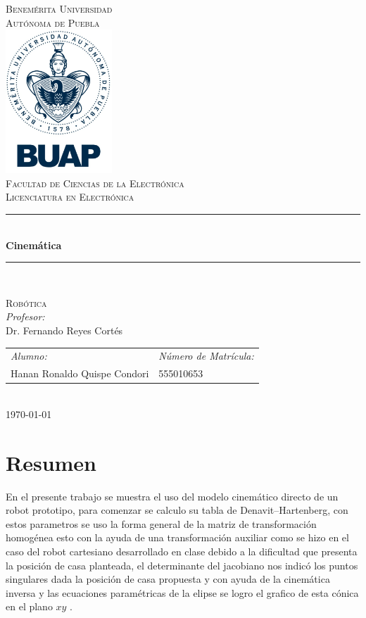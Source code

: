\documentclass[12pt]{article}
\date{\today}
\begin{document}
\begin{titlepage}
\newcommand{\HRule}{\rule{\linewidth}{0.5mm}} 
\center
\textsc{\LARGE  Benemérita Universidad \\[0.2cm] Autónoma de Puebla}\\[1.5cm] 
\includegraphics[width=4cm]{IMAGENES/escudo}\\[1cm]
\textsc{\Large Facultad de Ciencias de la Electrónica}\\[0.5cm] 
\textsc{\large Licenciatura en Electrónica}\\[0.5cm]
\HRule \\[0.4cm]
{ \huge \bfseries Cinemática}\\[0.4cm] 
\HRule \\[1.5cm]
\begin{minipage}{\textwidth}
\center 
\textsc{\LARGE Robótica}\\[1.7cm] 
\emph{Profesor:} \\
Dr. Fernando Reyes Cortés \\[1cm]
\begin{tabular}{ll}
\emph{Alumno:} & \emph{Número de Matrícula:}\\
Hanan Ronaldo Quispe Condori  & 555010653\\
\end{tabular}
\end{minipage}\\[2cm]
\today
\end{titlepage}

\newpage
\section{Resumen}
En el presente trabajo se muestra el uso del modelo cinemático directo de un robot prototipo, para comenzar se calculo su tabla de Denavit–Hartenberg, con estos parametros se uso la forma general de la matriz de transformación homogénea esto con la ayuda de una transformación auxiliar como se hizo en el caso del robot cartesiano desarrollado en clase debido a la dificultad que presenta la posición de casa planteada, el determinante del jacobiano nos indicó los puntos singulares dada la posición de casa propuesta y con ayuda de la cinemática inversa y las ecuaciones paramétricas de la elipse se logro el grafico de esta cónica en el plano $xy$ .
\newpage
\end{document}
